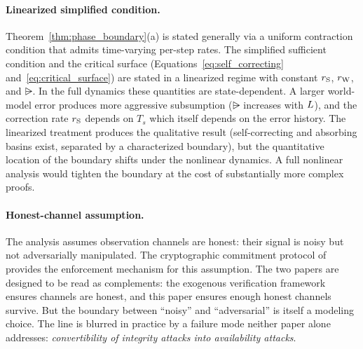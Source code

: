 \paragraph{Linearized simplified condition.}
Theorem~\ref{thm:phase_boundary}(a) is stated generally via a uniform
contraction condition that admits time-varying per-step rates.  The
simplified sufficient condition and the critical surface
(Equations~\ref{eq:self_correcting} and~\ref{eq:critical_surface}) are
stated in a linearized regime with constant $r_{\mathrm{S}}$, $r_{\mathrm{W}}$, and
$\rsub$.  In the full dynamics these quantities are state-dependent.  A larger world-model error produces more aggressive
subsumption ($\rsub$ increases with $L$), and the correction rate
$r_{\mathrm{S}}$ depends on $T_s$ which itself depends on the error history.
The linearized treatment produces the qualitative result
(self-correcting and absorbing basins exist, separated by a
characterized boundary), but the quantitative location of the boundary
shifts under the nonlinear dynamics.  A full nonlinear analysis would
tighten the boundary at the cost of substantially more complex
proofs.

\paragraph{Honest-channel assumption.}
The analysis assumes observation channels are honest: their signal is
noisy but not adversarially manipulated.  The cryptographic
commitment protocol of~\citet{lasser2026exo} provides the enforcement
mechanism for this assumption.  The two papers are designed to be
read as complements: the exogenous verification framework ensures
channels are honest, and this paper ensures enough honest channels
survive.  But the boundary between ``noisy'' and ``adversarial'' is
itself a modeling choice.  The line is blurred in practice by a
failure mode neither paper alone addresses: \emph{convertibility of
integrity attacks into availability attacks}.

